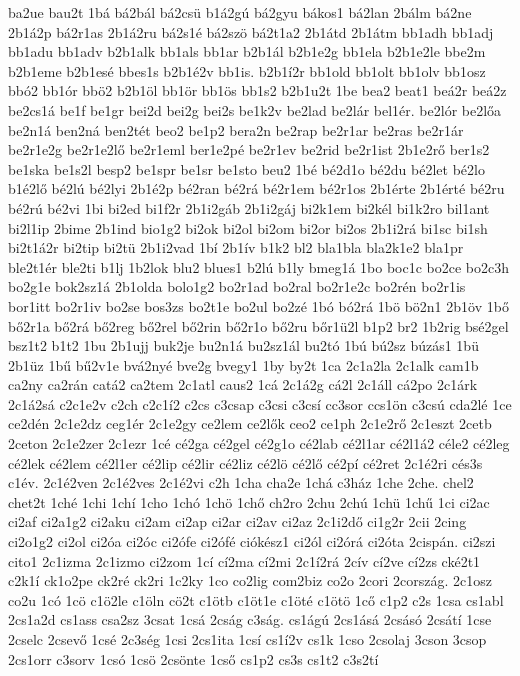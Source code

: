 {ba2ue
bau2t
1bá
bá2bál
bá2csü
b1á2gú
bá2gyu
bákos1
bá2lan
2bálm
bá2ne
2b1á2p
bá2r1as
2b1á2ru
bá2s1é
bá2szö
bá2t1a2
2b1átd
2b1átm
bb1adh
bb1adj
bb1adu
bb1adv
b2b1alk
bb1als
bb1ar
b2b1ál
b2b1e2g
bb1ela
b2b1e2le
bbe2m
b2b1eme
b2b1esé
bbes1s
b2b1é2v
bb1is.
b2b1í2r
bb1old
bb1olt
bb1olv
bb1osz
bbó2
bb1ór
bbö2
b2b1öl
bb1ör
bb1ös
bb1s2
b2b1u2t
1be
bea2
beat1
beá2r
beá2z
be2cs1á
be1f
be1gr
bei2d
bei2g
bei2s
be1k2v
be2lad
be2lár
bel1ér.
be2lór
be2lőa
be2n1á
ben2ná
ben2tét
beo2
be1p2
bera2n
be2rap
be2r1ar
be2ras
be2r1ár
be2r1e2g
be2r1e2lő
be2r1eml
ber1e2pé
be2r1ev
be2rid
be2r1ist
2b1e2rő
ber1s2
be1ska
be1s2l
besp2
be1spr
be1sr
be1sto
beu2
1bé
bé2d1o
bé2du
bé2let
bé2lo
b1é2lő
bé2lú
bé2lyi
2b1é2p
bé2ran
bé2rá
bé2r1em
bé2r1os
2b1érte
2b1érté
bé2ru
bé2rú
bé2vi
1bi
bi2ed
bi1f2r
2b1i2gáb
2b1i2gáj
bi2k1em
bi2kél
bi1k2ro
bil1ant
bi2l1ip
2bime
2b1ind
bio1g2
bi2ok
bi2ol
bi2om
bi2or
bi2os
2b1i2rá
bi1sc
bi1sh
bi2t1á2r
bi2tip
bi2tü
2b1i2vad
1bí
2b1ív
b1k2
bl2
bla1bla
bla2k1e2
bla1pr
ble2t1ér
ble2ti
b1lj
1b2lok
blu2
blues1
b2lú
b1ly
bmeg1á
1bo
boc1c
bo2ce
bo2c3h
bo2g1e
bok2sz1á
2b1olda
bolo1g2
bo2r1ad
bo2ral
bo2r1e2c
bo2rén
bo2r1is
bor1itt
bo2r1iv
bo2se
bos3zs
bo2t1e
bo2ul
bo2zé
1bó
bó2rá
1bö
bö2n1
2b1öv
1bő
bő2r1a
bő2rá
bő2reg
bő2rel
bő2rin
bő2r1o
bő2ru
bőr1ü2l
b1p2
br2
1b2rig
bsé2gel
bsz1t2
b1t2
1bu
2b1ujj
buk2je
bu2n1á
bu2sz1ál
bu2tó
1bú
bú2sz
búzás1
1bü
2b1üz
1bű
bű2v1e
bvá2nyé
bve2g
bvegy1
1by
by2t
1ca
2c1a2la
2c1alk
cam1b
ca2ny
ca2rán
catá2
ca2tem
2c1atl
caus2
1cá
2c1á2g
cá2l
2c1áll
cá2po
2c1árk
2c1á2sá
c2c1e2v
c2ch
c2c1í2
c2cs
c3csap
c3csi
c3csí
cc3sor
ccs1ön
c3csú
cda2lé
1ce
ce2dén
2c1e2dz
ceg1ér
2c1e2gy
ce2lem
ce2lők
ceo2
ce1ph
2c1e2rő
2c1eszt
2cetb
2ceton
2c1e2zer
2c1ezr
1cé
cé2ga
cé2gel
cé2g1o
cé2lab
cé2l1ar
cé2l1á2
céle2
cé2leg
cé2lek
cé2lem
cé2l1er
cé2lip
cé2lir
cé2liz
cé2lö
cé2lő
cé2pí
cé2ret
2c1é2ri
cés3s
c1év.
2c1é2ven
2c1é2ves
2c1é2vi
c2h
1cha
cha2e
1chá
c3ház
1che
2che.
chel2
chet2t
1ché
1chi
1chí
1cho
1chó
1chö
1chő
ch2ro
2chu
2chú
1chü
1chű
1ci
ci2ac
ci2af
ci2a1g2
ci2aku
ci2am
ci2ap
ci2ar
ci2av
ci2az
2c1i2dő
ci1g2r
2cii
2cing
ci2o1g2
ci2ol
ci2óa
ci2óc
ci2ófe
ci2ófé
ciókész1
ci2ól
ci2órá
ci2óta
2cispán.
ci2szi
cito1
2c1izma
2c1izmo
ci2zom
1cí
cí2ma
cí2mi
2c1í2rá
2cív
cí2ve
cí2zs
cké2t1
c2k1í
ck1o2pe
ck2ré
ck2ri
1c2ky
1co
co2lig
com2biz
co2o
2cori
2cország.
2c1osz
co2u
1có
1cö
c1ö2le
c1öln
cö2t
c1ötb
c1öt1e
c1öté
c1ötö
1cő
c1p2
c2s
1csa
cs1abl
2cs1a2d
cs1ass
csa2sz
3csat
1csá
2cság
c3ság.
cs1ágú
2cs1ásá
2csásó
2csátí
1cse
2cselc
2csevő
1csé
2c3ség
1csi
2cs1ita
1csí
cs1í2v
cs1k
1cso
2csolaj
3cson
3csop
2cs1orr
c3sorv
1csó
1csö
2csönte
1cső
cs1p2
cs3s
cs1t2
c3s2tí
}
